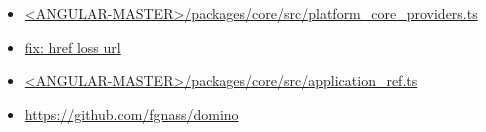 



\begin{itemize}
  \item \href{https://github.com/angular/angular/blob/master/packages/core/src/platform_core_providers.ts}
        {<ANGULAR-MASTER>/packages/core/src/platform\_core\_providers.ts}
\end{itemize}





\begin{itemize}
  \item \href{fix: href loss url}
        {fix: href loss url}
\end{itemize}





\begin{itemize}
  \item \href{https://github.com/angular/angular/blob/master/packages/core/src/application_ref.ts}
        {<ANGULAR-MASTER>/packages/core/src/application\_ref.ts}
\end{itemize}






\begin{itemize}
  \item \url{https://github.com/fgnass/domino}
\end{itemize}

